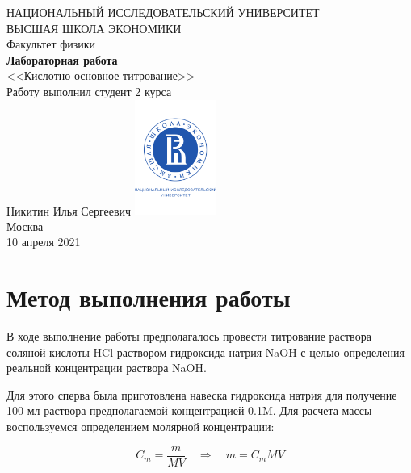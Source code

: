 \documentclass[a4paper, 12pt]{article}
\newcommand{\qrq}
{\ensuremath{\quad \Rightarrow \quad}} %
\begin{document}
	\begin{titlepage}
		\begin{center}
			$$$$
			$$$$
			$$$$
			$$$$
			{\Large{НАЦИОНАЛЬНЫЙ ИССЛЕДОВАТЕЛЬСКИЙ УНИВЕРСИТЕТ}}\\
			\vspace{0.1cm}
			{\Large{ВЫСШАЯ ШКОЛА ЭКОНОМИКИ}}\\
			\vspace{0.25cm}
			{\large{Факультет физики}}\\
			\vspace{5.5cm}
			{\Huge\textbf{{Лабораторная работа}}}\\%
			\vspace{1cm}
			{\LARGE{<<Кислотно-основное титрование>>}}\\%
			\vspace{2cm}
			{Работу выполнил студент 2 курса}\\
			{Никитин Илья Сергеевич}
			\vfill
			\includegraphics[width = 0.2\textwidth]{HSElogo}\\
			\vfill
			Москва\\
			10 апреля 2021
		\end{center}
	\end{titlepage}

\tableofcontents

\newpage

\section{Метод выполнения работы}

В ходе выполнение работы предполагалось провести титрование раствора соляной кислоты HCl раствором гидроксида натрия NaOH с целью определения реальной концентрации раствора NaOH.

Для этого сперва была приготовлена навеска гидроксида натрия для получение 100 мл раствора предполагаемой концентрацией 0.1M. Для расчета массы воспользуемся определением молярной концентрации:

\begin{equation}
		C_m = \frac{m}{M V} \qrq m = C_m M V
		\label{eq:NaOH_mass}
\end{equation}
\end{document}
